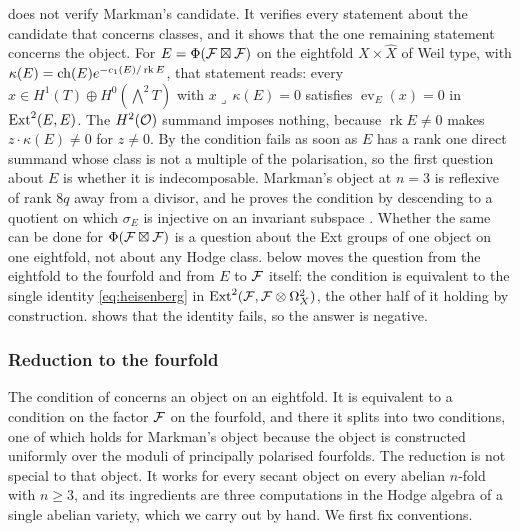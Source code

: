 \begin{remark}\label{rem:onecondition}
 does not verify Markman's candidate. It verifies every
statement about the candidate that concerns classes, and it shows that the
one remaining statement concerns the object. For
$E=\Phi(\mathcal{F}\boxtimes\mathcal{F})$ on the eightfold $X\times\widehat X$ of Weil type,
with $\kappa(E)=\operatorname{ch}(E)e^{-c_{1}(E)/\operatorname{rk}E}$, that statement reads:
every $x\in H^{1}(T)\oplus H^{0}(\bigwedge^{2}T)$ with
$x\lrcorner\,\kappa(E)=0$ satisfies $\operatorname{ev}_{E}(x)=0$ in
$\operatorname{Ext}^{2}(E,E)$. The $H^{2}(\mathcal{O})$ summand imposes nothing, because
$\operatorname{rk}E\ne0$ makes $z\cdot\kappa(E)\ne0$ for $z\ne0$. By
 the condition fails as soon as $E$ has a rank one
direct summand whose class is not a multiple of the polarisation, so the
first question about $E$ is whether it is indecomposable. Markman's object
at $n=3$ is reflexive of rank $8q$ away from a divisor, and he proves the
condition by descending to a quotient on which $\sigma_{E}$ is injective on
an invariant subspace \cite[Proposition 11.5]{Mar25b}. Whether the same can
be done for $\Phi(\mathcal{F}\boxtimes\mathcal{F})$ is a question about the Ext groups of one
object on one eightfold, not about any Hodge class.  below
moves the question from the eightfold to the fourfold and from $E$ to $\mathcal{F}$
itself: the condition is equivalent to the single identity
\eqref{eq:heisenberg} in $\operatorname{Ext}^{2}(\mathcal{F},\mathcal{F}\otimes\Omega^{2}_{X})$, the other
half of it holding by construction.  shows that the
identity fails, so the answer is negative.
\end{remark}

\subsubsection*{Reduction to the fourfold}

The condition of  concerns an object on an eightfold.
It is equivalent to a condition on the factor $\mathcal{F}$ on the fourfold, and
there it splits into two conditions, one of which holds for Markman's object
because the object is constructed uniformly over the moduli of principally
polarised fourfolds. The reduction is not special to that object. It works
for every secant object on every abelian $n$-fold with $n\ge3$, and its
ingredients are three computations in the Hodge algebra of a single abelian
variety, which we carry out by hand. We first fix
conventions.

